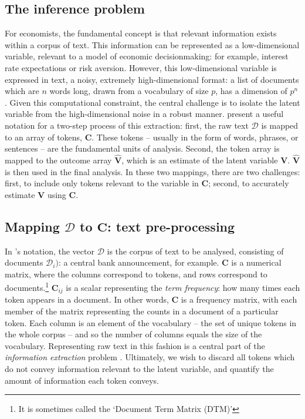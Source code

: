\documentclass{article}
\begin{document}
\subsection{The inference problem}
For economists, the fundamental concept is that relevant information exists within a corpus of text. This information can be represented as a low-dimensional variable, relevant to a model of economic decisionmaking: for example, interest rate expectations or risk aversion. However, this low-dimensional variable is expressed in text, a noisy, extremely high-dimensional format: a list of documents which are \(n\) words long, drawn from a vocabulary of size \(p\), has a dimension of \(p^n\). Given this computational constraint, the central challenge is to isolate the latent variable from the high-dimensional noise in a robust manner.  \textcite{gentzkowTextData2019} present a useful notation for a two-step process of this extraction: first, the raw text \(\mathcal{D}\) is mapped to an array of tokens, \(\mathbf{C}\). These tokens -- usually in the form of words, phrases, or sentences -- are the fundamental units of analysis. Second, the token array is mapped to the outcome array \(\hat{\mathbf{V}}\), which is an estimate of the latent variable \(\mathbf{V}\). \(\hat{\mathbf{V}} \) is then used in the final analysis. In these two mappings, there are two challenges: first, to include only tokens relevant to the variable in \(\mathbf{C}\); second, to accurately estimate  \(\mathbf{V} \) using \(\mathbf{C}\). 

\subsection{Mapping \(\mathcal{D}\) to \(\mathbf{C}\): text pre-processing}\label{preprocess}
In \textcite{gentzkowTextData2019}'s notation, the vector \(\mathcal{D}\) is the corpus of text to be analysed, consisting of documents \(\mathcal{D}_i)\): a central bank announcement, for example. \(\mathbf{C}\) is a numerical matrix, where the columns correspond to tokens, and rows correspond to documents.\footnote{It is sometimes called the `Document Term Matrix (DTM)'} \(\mathbf{C}_{ij}\) is a scalar representing the \textit{term frequency}: how many times each token appears in a document. In other words, \(\mathbf{C}\) is a frequency matrix, with each member of the matrix representing the counts in a document of a particular token. Each column is an element of the vocabulary -- the set of unique tokens in the whole corpus -- and so the number of columns equals the size of the vocabulary. Representing raw text in this fashion is a central part of the \textit{information extraction} problem \parencite[529]{manningFoundationsStatisticalNatural1999}. Ultimately, we wish to discard all tokens which do not convey information relevant to the latent variable, and quantify the amount of information each token conveys.
\end{document}

